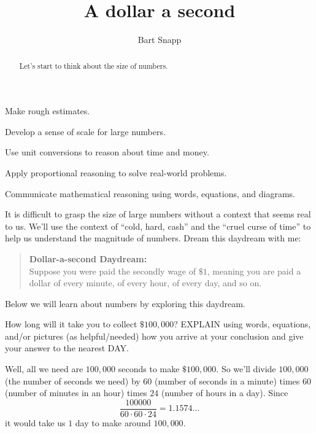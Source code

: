\documentclass[nooutcomes,noauthor,hints,handout]{ximera}
\title{A dollar a second}
\author{Bart Snapp}
\begin{document}
\begin{abstract}
  Let's start to think about the size of numbers.
\end{abstract}
\maketitle

\begin{listOutcomes}
\item Make rough estimates.
\item Develop a sense of scale for large numbers.
\item Use unit conversions to reason about time and money.
\item Apply proportional reasoning to solve real-world problems.
\item Communicate mathematical reasoning using words, equations, and diagrams.
\end{listOutcomes}


It is difficult to grasp the size of large numbers without a context
that seems real to us. We'll use the context of ``cold, hard, cash''
and the ``cruel curse of time'' to help us understand the magnitude of
numbers.  Dream this daydream with me:
\begin{mdframed}[style=OutcomeStyle]
  \begin{quote}
    \textbf{Dollar-a-second Daydream:}\\
  Suppose you were paid the secondly wage of $\$1$, meaning you are
  paid a dollar  of every minute, of every hour, of
  every day, and so on.
\end{quote}
\end{mdframed}
Below we will learn about numbers by exploring this daydream.



\mynewpage

\begin{question}
  How long will it take you to collect $\$100,000$? EXPLAIN using
  words, equations, and/or pictures (as helpful/needed) how you arrive
  at your conclusion and give your answer to the nearest DAY.
  \begin{freeResponse}
    Well, all we need are $100,000$ seconds to make $\$100,000$. So
    we'll divide $100,000$ (the number of seconds we need) by $60$
    (number of seconds in a minute) times $60$ (number of minutes in
    an hour) times $24$ (number of hours in a day).  Since
    \[
    \frac{100000}{60\cdot 60\cdot 24} = 1.1574\dots
    \]
    it would take us $1$ day to make around $100,000$.
  \end{freeResponse}
\end{question}
\mynewpage
\end{document}

